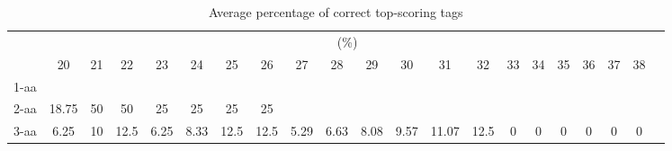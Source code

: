 \begin{table}[h]\tiny
\vspace{3mm}
{\centering
\begin{center}
\begin{tabular}{|l|c|c|c|c|c|c|c|c|c|c|c|c|c|c|c|c|c|c|c|c|}
  \hline
  & \multicolumn{ 19 }{|c|}{(\%)} \\
  \cline{2- 20}
    & 20 & 21 & 22 & 23 & 24 & 25 & 26 & 27 & 28 & 29 & 30 & 31 & 32 & 33 & 34 & 35 & 36 & 37 & 38\\
  \hline
1-aa  &  &  &  &  &  &  &  &  &  &  &  &  &  &  &  &  &  &  & \\
2-aa  & 18.75 & 50 & 50 & 25 & 25 & 25 & 25 &  &  &  &  &  &  &  &  &  &  &  & \\
3-aa  & 6.25 & 10 & 12.5 & 6.25 & 8.33 & 12.5 & 12.5 & 5.29 & 6.63 & 8.08 & 9.57 & 11.07 & 12.5 & 0 & 0 & 0 & 0 & 0 & 0\\
 \hline
\end{tabular}
\end{center}
\par}
\centering
\caption{ Average percentage of correct top-scoring tags}
\vspace{3mm}
\label{table:k}
\end{table}